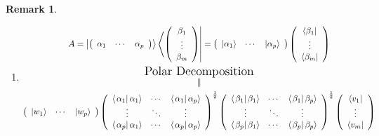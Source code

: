 \documentclass[aps,preprint]{revtex4}%
\newtheorem{remark}[theorem]{Remark}
\begin{document}
\begin{remark}
\begin{enumerate}
\begin{enumerate}
\item
\begin{gather}
A=\left\vert \left(
\begin{array}
[c]{ccc}%
\alpha_{1} & \cdots & \alpha_{p}%
\end{array}
\right)  \right\rangle \left\langle \left(
\begin{array}
[c]{c}%
\beta_{1}\\
\vdots\\
\beta_{m}%
\end{array}
\right)  \right\vert =\left(
\begin{array}
[c]{ccc}%
\left\vert \alpha_{1}\right\rangle  & \cdots & \left\vert \alpha
_{p}\right\rangle
\end{array}
\right)  \left(
\begin{array}
[c]{c}%
\left\langle \beta_{1}\right\vert \\
\vdots\\
\left\langle \beta_{m}\right\vert
\end{array}
\right) \\
\overset{\text{{\Large Polar Decomposition}}}{\parallel}\\
\left(
\begin{array}
[c]{ccc}%
\left\vert w_{1}\right\rangle  & \cdots & \left\vert w_{p}\right\rangle
\end{array}
\right)  \left(
\begin{array}
[c]{ccc}%
\left\langle \left.  \alpha_{1}\right\vert \alpha_{1}\right\rangle  & \cdots &
\left\langle \left.  \alpha_{1}\right\vert \alpha_{p}\right\rangle \\
\vdots & \ddots & \vdots\\
\left\langle \left.  \alpha_{p}\right\vert \alpha_{1}\right\rangle  & \cdots &
\left\langle \left.  \alpha_{p}\right\vert \alpha_{p}\right\rangle
\end{array}
\right)  ^{\frac{1}{2}}\left(
\begin{array}
[c]{ccc}%
\left\langle \left.  \beta_{1}\right\vert \beta_{1}\right\rangle  & \cdots &
\left\langle \left.  \beta_{1}\right\vert \beta_{p}\right\rangle \\
\vdots & \ddots & \vdots\\
\left\langle \left.  \beta_{p}\right\vert \beta_{1}\right\rangle  & \cdots &
\left\langle \left.  \beta_{p}\right\vert \beta_{p}\right\rangle
\end{array}
\right)  ^{\frac{1}{2}}\left(
\begin{array}
[c]{c}%
\left\langle v_{1}\right\vert \\
\vdots\\
\left\langle v_{m}\right\vert
\end{array}
\right)
\end{gather}



\end{enumerate}
\end{enumerate}
\end{remark}
\end{document}
